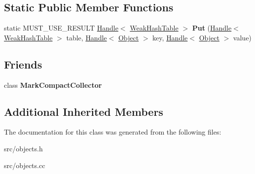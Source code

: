 \subsection*{Static Public Member Functions}
\begin{DoxyCompactItemize}
\item 
\hypertarget{classv8_1_1internal_1_1_weak_hash_table_af5aa1e2580c3e44459897da2f3500bb5}{}static M\+U\+S\+T\+\_\+\+U\+S\+E\+\_\+\+R\+E\+S\+U\+L\+T \hyperlink{classv8_1_1internal_1_1_handle}{Handle}$<$ \hyperlink{classv8_1_1internal_1_1_weak_hash_table}{Weak\+Hash\+Table} $>$ {\bfseries Put} (\hyperlink{classv8_1_1internal_1_1_handle}{Handle}$<$ \hyperlink{classv8_1_1internal_1_1_weak_hash_table}{Weak\+Hash\+Table} $>$ table, \hyperlink{classv8_1_1internal_1_1_handle}{Handle}$<$ \hyperlink{classv8_1_1internal_1_1_object}{Object} $>$ key, \hyperlink{classv8_1_1internal_1_1_handle}{Handle}$<$ \hyperlink{classv8_1_1internal_1_1_object}{Object} $>$ value)\label{classv8_1_1internal_1_1_weak_hash_table_af5aa1e2580c3e44459897da2f3500bb5}

\end{DoxyCompactItemize}
\subsection*{Friends}
\begin{DoxyCompactItemize}
\item 
\hypertarget{classv8_1_1internal_1_1_weak_hash_table_ae585a96455613b2bc2ae3ea75a061d8b}{}class {\bfseries Mark\+Compact\+Collector}\label{classv8_1_1internal_1_1_weak_hash_table_ae585a96455613b2bc2ae3ea75a061d8b}

\end{DoxyCompactItemize}
\subsection*{Additional Inherited Members}


The documentation for this class was generated from the following files\+:\begin{DoxyCompactItemize}
\item 
src/objects.\+h\item 
src/objects.\+cc\end{DoxyCompactItemize}
